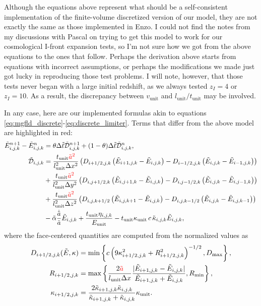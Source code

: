\documentclass[10pt]{article}
\renewcommand{\(}{\left(}
\renewcommand{\)}{\right)}
\newcommand{\mD}{{\mathcal D}}
\newcommand{\Lunit}{l_{\text{unit}}}
\newcommand{\Tunit}{t_{\text{unit}}}
\newcommand{\Vunit}{v_{\text{unit}}}
\newcommand{\Eunit}{E_{\text{unit}}}
\newcommand{\Kunit}{\kappa_{\text{unit}}}
\newcommand{\tK}{\tilde{\kappa}}
\newcommand{\tT}{\tilde{t}}
\newcommand{\tE}{\tilde{E}}
\newcommand{\tA}{\tilde{a}}
\newcommand{\tmD}{\tilde{\mD}}
\newcommand{\talpha}{\tilde{\alpha}}
\begin{document}
Although the equations above represent what should be a
self-consistent implementation of the finite-volume discretized
version of our model, they are not exactly the same as those
implemented in Enzo.  I could not find the notes from my discussions
with Pascal on trying to get this model to work for our cosmological
I-front expansion tests, so I'm not sure how we got from the above
equations to the ones that follow.  Perhaps the derivation above
starts from equations with incorrect assumptions, or perhaps the
modifications we made just got lucky in reproducing those test
problems.  I will note, however, that those tests never began with a
large initial redshift, as we always tested $z_I = 4$ or $z_I = 10$.
As a result, the discrepancy between $\Vunit$ and $\Lunit/\Tunit$ may
be involved.

In any case, here are our implemented formulas akin to equations 
\eqref{eq:mgfld_discrete}-\eqref{eq:discrete_limiter}.  Terms that
differ from the above model are highlighted in {\color{red} red}:
\begin{align}
  \label{eq:mgfld_implemented}
    \tE_{i,j,k}^{n+1} - \tE_{i,j,k}^n &= \theta \Delta \tT
    \tmD_{i,j,k}^{n+1} + (1-\theta) \Delta \tT \tmD_{i,j,k}^n, \\
  \notag
  \tmD_{i,j,k} &= 
       \frac{\Tunit {\color{red}\tA^2}}{\Lunit^2 \Delta x^2}\(D_{i+1/2,j,k}\(\tE_{i+1,j,k} - \tE_{i,j,k}\) - D_{i-1/2,j,k}\(\tE_{i,j,k} - \tE_{i-1,j,k}\)\) \\
  \notag
    &+ \frac{\Tunit {\color{red}\tA^2}}{\Lunit^2 \Delta y^2}\(D_{i,j+1/2,k}\(\tE_{i,j+1,k} - \tE_{i,j,k}\) - D_{i,j-1/2,k}\(\tE_{i,j,k} - \tE_{i,j-1,k}\)\) \\
  \notag
    &+ \frac{\Tunit {\color{red}\tA^2}}{\Lunit^2 \Delta z^2}\(D_{i,j,k+1/2}\(\tE_{i,j,k+1} - \tE_{i,j,k}\) - D_{i,j,k-1/2}\(\tE_{i,j,k} - \tE_{i,j,k-1}\)\) \\
  \notag
    &- \talpha\frac{\dot{\tA}}{\tA} \tE_{i,j,k} + \frac{\Tunit \eta_{i,j,k}}{\Eunit}
     - \Tunit \Kunit\, c\, \tK_{i,j,k} \tE_{i,j,k},
\end{align}
where the face-centered quantities are computed from the normalized
values as
\begin{align}
  \label{eq:limiter_implemented}
  D_{i+1/2,j,k}(\tE,\kappa) &= \min\left\{ c \left(9\kappa_{i+1/2,j,k}^2 + R_{i+1/2,j,k}^2\right)^{-1/2},
    D_\text{max} \right\},\\
  \notag
  R_{i+1/2,j,k} &= \max\left\{\frac{2{\color{red}\tA}}{\Lunit \Delta x} \frac{|\tE_{i+1,j,k}-\tE_{i,j,k}|}{\tE_{i+1,j,k}+\tE_{i,j,k}}, R_\text{min} \right\}, \\
  \notag
  \kappa_{i+1/2,j,k} &= \frac{2 \tK_{i+1,j,k} \tK_{i,j,k}}{
    \tK_{i+1,j,k} + \tK_{i,j,k}} \Kunit.
\end{align}







\end{document}
